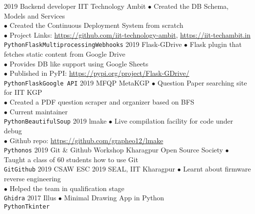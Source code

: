 \documentclass[9pt]{developercv} %
\begin{document}
\begin{entrylist}
	\entry
		{2019}
		{Backend developer}
		{IIT Technology Ambit}
		{$\bullet$ Created the DB Schema, Models and Services\\
		 $\bullet$ Created the Continuous Deployment System from scratch\\
		 $\bullet$ Project Links:  \url{https://github.com/iit-technology-ambit}, \url{https://iit-techambit.in}\\
		 \texttt{Python}\slashsep\texttt{Flask}\slashsep\texttt{Multiprocessing}\slashsep\texttt{Webhooks}}
	\entry
		{2019}
		{Flask-GDrive}
		{}
		{$\bullet$ Flask plugin that fetches static content from Google Drive\\ 
		 $\bullet$ Provides DB like support using Google Sheets\\
		 $\bullet$ Published in PyPI: \url{https://pypi.org/project/Flask-GDrive/}\\
		 \texttt{Python}\slashsep\texttt{Flask}\slashsep\texttt{Google API}}
	\entry
		{2019}
		{MFQP}
		{MetaKGP}
		{$\bullet$ Question Paper searching site for IIT KGP\\ 
		 $\bullet$ Created a PDF question scraper and organizer based on BFS\\
		 $\bullet$ Current maintainer\\
		 \texttt{Python}\slashsep\texttt{BeautifulSoup}}
	\entry
		{2019}
		{lmake}
		{}
		{$\bullet$ Live compilation facility for code under debug\\ 
		 $\bullet$ Github repo: \url{https://github.com/grapheo12/lmake}\\
		\texttt{Python}\slashsep\texttt{os}}
	\entry
		{2019}
		{Git \& Github Workshop}
		{Kharagpur Open Source Society}
		{$\bullet$ Taught a class of 60 students how to use Git\\
		\texttt{Git}\slashsep\texttt{Github}}
	\entry
		{2019}
		{CSAW ESC 2019}
		{SEAL, IIT Kharagpur}
		{$\bullet$ Learnt about firmware reverse engineering\\ 
		 $\bullet$ Helped the team in qualification stage\\
		\texttt{Ghidra}}
	\entry
		{2017}
		{Illus}
		{}
		{$\bullet$ Minimal Drawing App in Python\\ 
		\texttt{Python}\slashsep\texttt{Tkinter}}
\end{entrylist}
\break
\end{document}
